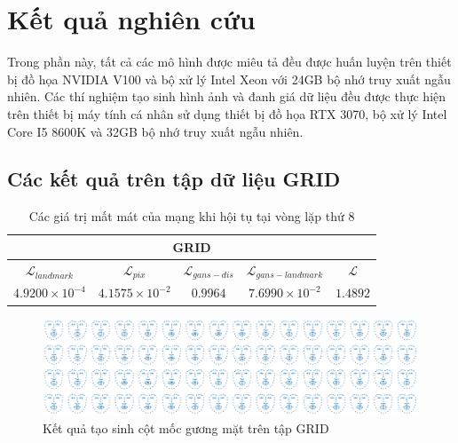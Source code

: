 \section{\texorpdfstring{Kết quả nghiên cứu}{result}}

Trong phần này, tất cả các mô hình được miêu tả đều được huấn luyện trên thiết bị đồ họa NVIDIA V100 và bộ xử lý Intel Xeon với 24GB bộ nhớ truy xuất ngẫu nhiên. Các thí nghiệm tạo sinh hình ảnh và đanh giá dữ liệu đều được thực hiện trên thiết bị máy tính cá nhân sử dụng thiết bị đồ họa RTX 3070, bộ xử lý Intel Core I5 8600K và 32GB bộ nhớ truy xuất ngẫu nhiên.

\subsection{Các kết quả trên tập dữ liệu GRID}

\begin{table}[h]
    \centering
    \begin{tabular}{c | c | c | c | c}
    \hline 
    \multicolumn{5}{c}{GRID}\\
    \hline 
    \textbf{$\mathcal{L}_{landmark}$} & \textbf{$\mathcal{L}_{pix}$} & \textbf{$\mathcal{L}_{gans-dis}$} & \textbf{$\mathcal{L}_{gans-landmark}$} & \textbf{$\mathcal{L}$}\\
    \hline
    $4.9200 \times 10^{-4}$ & $4.1575 \times 10^{-2}$ & $0.9964$ & $7.6990 \times 10^{-2}$ & $1.4892$\\
    \end{tabular}
    \caption{Các giá trị mất mát của mạng khi hội tụ tại vòng lặp thứ 8}
    \label{table:grid_loss}
\end{table}

\begin{figure}[H]
    \centering
    \includegraphics[width=15cm]{./content/materials/grid_examples-landmark.png}
    \caption{Kết quả tạo sinh cột mốc gương mặt trên tập GRID}
\end{figure}


